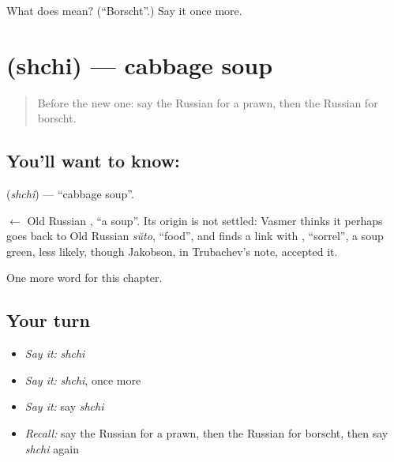 \begin{tcolorbox}[breakable,colback=teal!4,colframe=teal!35!black,title={Before you move on}]
What does  mean? (\textquotedblleft{}Borscht\textquotedblright{}.) Say it once more.
\end{tcolorbox}
\section[\texorpdfstring{\ru{щи} (shchi)}{щи (shchi)}]{ (shchi) — cabbage soup}

\label{lesson:RU-C163-shchi}



\begin{quote}
Before the new one: say the Russian for a prawn, then the Russian for borscht.
\end{quote}

\subsection*{You'll want to know: }
\textbf{} (\emph{shchi}) — \textquotedblleft{}cabbage soup\textquotedblright{}.

\begin{cousinweb}
\textbf{} $\leftarrow$ Old Russian \emph{}, \textquotedblleft{}a soup\textquotedblright{}. Its origin is not settled: Vasmer thinks it perhaps goes back to Old Russian \emph{sŭto}, \textquotedblleft{}food\textquotedblright{}, and finds a link with \emph{}, \textquotedblleft{}sorrel\textquotedblright{}, a soup green, less likely, though Jakobson, in Trubachev's note, accepted it.
\end{cousinweb}

\begin{grammarlens}[title={What you've built}]
One more word for this chapter.
\end{grammarlens}

\subsection*{Your turn}
\begin{itemize}
\raggedright
  \item \emph{Say it:} \emph{shchi}
  \item \emph{Say it:} \emph{shchi}, once more
  \item \emph{Say it:} say \emph{shchi}
  \item \emph{Recall:} say the Russian for a prawn, then the Russian for borscht, then say \emph{shchi} again
\end{itemize}

